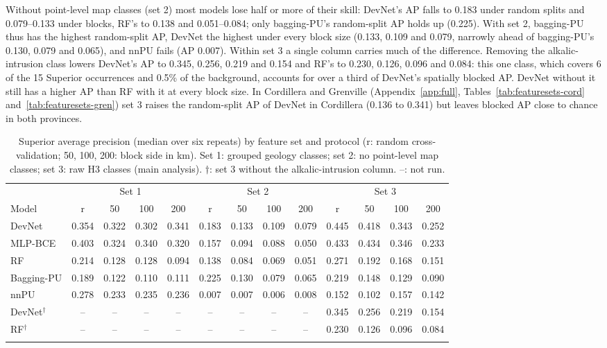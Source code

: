 \documentclass[pdflatex,sn-apa]{sn-jnl}
\begin{document}
Without point-level map classes (set 2) most models lose half or more of their skill: DevNet's AP falls to 0.183 under random splits and 0.079--0.133 under blocks, RF's to 0.138 and 0.051--0.084; only bagging-PU's random-split AP holds up (0.225). With set 2, bagging-PU thus has the highest random-split AP, DevNet the highest under every block size (0.133, 0.109 and 0.079, narrowly ahead of bagging-PU's 0.130, 0.079 and 0.065), and nnPU fails (AP 0.007). Within set 3 a single column carries much of the difference. Removing the alkalic-intrusion class lowers DevNet's AP to 0.345, 0.256, 0.219 and 0.154 and RF's to 0.230, 0.126, 0.096 and 0.084: this one class, which covers 6 of the 15 Superior occurrences and 0.5\% of the background, accounts for over a third of DevNet's spatially blocked AP. DevNet without it still has a higher AP than RF with it at every block size. In Cordillera and Grenville (Appendix~\ref{app:full}, Tables~\ref{tab:featuresets-cord} and~\ref{tab:featuresets-gren}) set 3 raises the random-split AP of DevNet in Cordillera (0.136 to 0.341) but leaves blocked AP close to chance in both provinces.

\begin{table}[t]
\caption{Superior average precision (median over six repeats) by feature set and protocol (r: random cross-validation; 50, 100, 200: block side in km). Set 1: grouped geology classes; set 2: no point-level map classes; set 3: raw H3 classes (main analysis). $\dagger$: set 3 without the alkalic-intrusion column. --: not run.}\label{tab:featuresets}
\scriptsize
\setlength{\tabcolsep}{1.5pt}
\begin{tabular*}{\textwidth}{@{\extracolsep\fill}lcccccccccccc}
\toprule
 & \multicolumn{4}{c}{Set 1} & \multicolumn{4}{c}{Set 2} & \multicolumn{4}{c}{Set 3} \\
\cmidrule(lr){2-5}\cmidrule(lr){6-9}\cmidrule(lr){10-13}
Model & r & 50 & 100 & 200 & r & 50 & 100 & 200 & r & 50 & 100 & 200 \\
\midrule
DevNet & 0.354 & 0.322 & 0.302 & 0.341 & 0.183 & 0.133 & 0.109 & 0.079 & 0.445 & 0.418 & 0.343 & 0.252 \\
MLP-BCE & 0.403 & 0.324 & 0.340 & 0.320 & 0.157 & 0.094 & 0.088 & 0.050 & 0.433 & 0.434 & 0.346 & 0.233 \\
RF & 0.214 & 0.128 & 0.128 & 0.094 & 0.138 & 0.084 & 0.069 & 0.051 & 0.271 & 0.192 & 0.168 & 0.151 \\
Bagging-PU & 0.189 & 0.122 & 0.110 & 0.111 & 0.225 & 0.130 & 0.079 & 0.065 & 0.219 & 0.148 & 0.129 & 0.090 \\
nnPU & 0.278 & 0.233 & 0.235 & 0.236 & 0.007 & 0.007 & 0.006 & 0.008 & 0.152 & 0.102 & 0.157 & 0.142 \\
DevNet$^\dagger$ & -- & -- & -- & -- & -- & -- & -- & -- & 0.345 & 0.256 & 0.219 & 0.154 \\
RF$^\dagger$ & -- & -- & -- & -- & -- & -- & -- & -- & 0.230 & 0.126 & 0.096 & 0.084 \\
\botrule
\end{tabular*}
\end{table}
\end{document}
